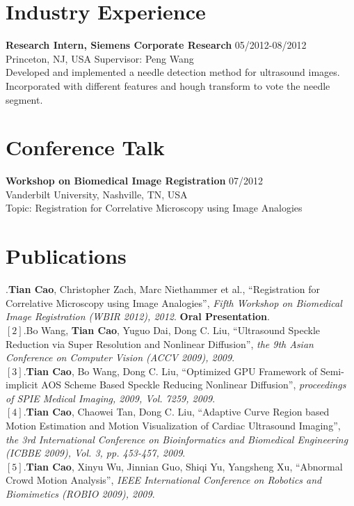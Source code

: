\documentclass[line,margin]{res}
\begin{document}
\begin{resume}
\section{\sc Industry Experience} 
\smallskip

\textbf{Research Intern, Siemens Corporate Research} \hfill      05/2012-08/2012 \\
Princeton, NJ, USA  \hfill {Supervisor: Peng Wang}\\
Developed and implemented a needle detection method for ultrasound images. Incorporated with different features and hough transform to vote the needle segment.\vspace{.05in} %

\section{\sc Conference Talk} 
\smallskip

\textbf{Workshop on Biomedical Image Registration} \hfill      07/2012 \\
Vanderbilt University, Nashville, TN, USA  \hfill \\%
Topic:  Registration for Correlative Microscopy using Image Analogies \vspace{.05in}

\section{\sc Publications}  
\smallskip
[1].\textbf{Tian Cao}, Christopher Zach, Marc Niethammer et al., ``Registration for Correlative Microscopy using Image Analogies'',  \emph{Fifth Workshop on Biomedical Image Registration (WBIR 2012), 2012}. \textbf{Oral Presentation}.\vspace{.05in}\\%
$[2]$.Bo Wang, \textbf{Tian Cao}, Yuguo Dai, Dong C. Liu, ``Ultrasound Speckle Reduction via Super Resolution and Nonlinear Diffusion'',  \emph{the 9th Asian Conference on Computer Vision (ACCV 2009), 2009}. \vspace{.05in}\\
$[3]$.\textbf{Tian Cao}, Bo Wang, Dong C. Liu, ``Optimized GPU Framework of Semi-implicit AOS
Scheme Based Speckle Reducing Nonlinear Diﬀusion'',  \emph{proceedings of SPIE Medical Imaging, 2009, Vol. 7259, 2009}.\vspace{.05in}\\%
$[4]$.\textbf{Tian Cao}, Chaowei Tan, Dong C. Liu, ``Adaptive Curve Region based Motion Estimation and Motion Visualization of Cardiac Ultrasound Imaging'',  \emph{the 3rd International Conference on Bioinformatics and Biomedical Engineering (ICBBE 2009), Vol. 3, pp. 453-457, 2009}.\vspace{.05in}\\
$[5]$.\textbf{Tian Cao}, Xinyu Wu, Jinnian Guo, Shiqi Yu, Yangsheng Xu, ``Abnormal Crowd Motion Analysis'', \emph{IEEE International Conference on Robotics and Biomimetics (ROBIO 2009), 2009}.


\end{resume}
\end{document}
